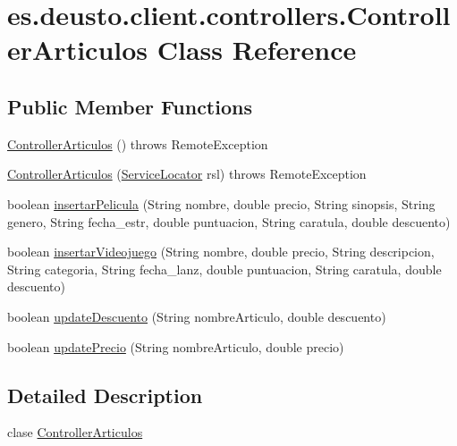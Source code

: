 \hypertarget{classes_1_1deusto_1_1client_1_1controllers_1_1_controller_articulos}{}\section{es.\+deusto.\+client.\+controllers.\+Controller\+Articulos Class Reference}
\label{classes_1_1deusto_1_1client_1_1controllers_1_1_controller_articulos}
\subsection*{Public Member Functions}
\begin{DoxyCompactItemize}
\item 
\mbox{\hyperlink{classes_1_1deusto_1_1client_1_1controllers_1_1_controller_articulos_abce7824d661f6d557576ff1b382702ab}{Controller\+Articulos}} ()  throws Remote\+Exception 
\item 
\mbox{\hyperlink{classes_1_1deusto_1_1client_1_1controllers_1_1_controller_articulos_aa0881e299b84ac2ddde4203b67c91a60}{Controller\+Articulos}} (\mbox{\hyperlink{classes_1_1deusto_1_1client_1_1remote_1_1_service_locator}{Service\+Locator}} rsl)  throws Remote\+Exception 
\item 
boolean \mbox{\hyperlink{classes_1_1deusto_1_1client_1_1controllers_1_1_controller_articulos_a64c5bfffa1bbd9c9d8c2cd4b07544dba}{insertar\+Pelicula}} (String nombre, double precio, String sinopsis, String genero, String fecha\+\_\+estr, double puntuacion, String caratula, double descuento)
\item 
boolean \mbox{\hyperlink{classes_1_1deusto_1_1client_1_1controllers_1_1_controller_articulos_a41c9b6d7c3361d15b453d8733aa23a35}{insertar\+Videojuego}} (String nombre, double precio, String descripcion, String categoria, String fecha\+\_\+lanz, double puntuacion, String caratula, double descuento)
\item 
boolean \mbox{\hyperlink{classes_1_1deusto_1_1client_1_1controllers_1_1_controller_articulos_a98a6386989ddcdd3d93e55a4c8c656ed}{update\+Descuento}} (String nombre\+Articulo, double descuento)
\item 
boolean \mbox{\hyperlink{classes_1_1deusto_1_1client_1_1controllers_1_1_controller_articulos_ab0520bd5b5a3960d429a5e2af86fdfe7}{update\+Precio}} (String nombre\+Articulo, double precio)
\end{DoxyCompactItemize}


\subsection{Detailed Description}
clase \mbox{\hyperlink{classes_1_1deusto_1_1client_1_1controllers_1_1_controller_articulos}{Controller\+Articulos}} 

